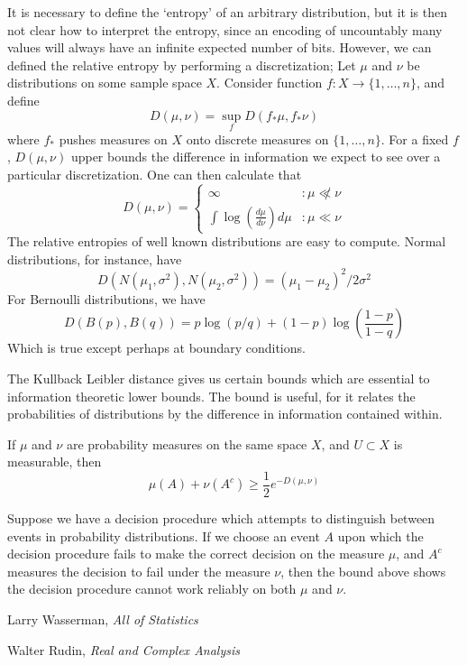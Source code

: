 It is necessary to define the `entropy' of an arbitrary distribution, but it is then not clear how to interpret the entropy, since an encoding of uncountably many values will always have an infinite expected number of bits. However, we can defined the relative entropy by performing a discretization; Let $\mu$ and $\nu$ be distributions on some sample space $X$. Consider function $f: X \to \{ 1, \dots, n \}$, and define
%
\[ D(\mu, \nu) = \sup_f D(f_* \mu, f_* \nu) \]
%
where $f_*$ pushes measures on $X$ onto discrete measures on $\{ 1, \dots, n \}$. For a fixed $f$, $D(\mu, \nu)$ upper bounds the difference in information we expect to see over a particular discretization. One can then calculate that
%
\[ D(\mu, \nu) = \begin{cases} \infty &: \mu \not \ll \nu \\ \int \log(\frac{d\mu}{d\nu}) d\mu &: \mu \ll \nu \end{cases} \]
%
The relative entropies of well known distributions are easy to compute. Normal distributions, for instance, have
%
\[ D(N(\mu_1, \sigma^2), N(\mu_2, \sigma^2)) = (\mu_1 - \mu_2)^2/2\sigma^2 \]
%
For Bernoulli distributions, we have
%
\[ D(B(p), B(q)) = p \log(p/q) + (1-p)\log \left( \frac{1-p}{1-q} \right) \]
%
Which is true except perhaps at boundary conditions.

The Kullback Leibler distance gives us certain bounds which are essential to information theoretic lower bounds. The bound is useful, for it relates the probabilities of distributions by the difference in information contained within.

\begin{theorem}
    If $\mu$ and $\nu$ are probability measures on the same space $X$, and $U \subset X$ is measurable, then
    \[ \mu(A) + \nu(A^c) \geq \frac{1}{2} e^{- D(\mu, \nu)} \]
\end{theorem}

Suppose we have a decision procedure which attempts to distinguish between events in probability distributions. If we choose an event $A$ upon which the decision procedure fails to make the correct decision on the measure $\mu$, and $A^c$ measures the decision to fail under the measure $\nu$, then the bound above shows the decision procedure cannot work reliably on both $\mu$ and $\nu$.

\begin{thebibliography}{10}
     Larry Wasserman,
    \emph{All of Statistics}

     Walter Rudin,
    \emph{Real and Complex Analysis}
\end{thebibliography}



